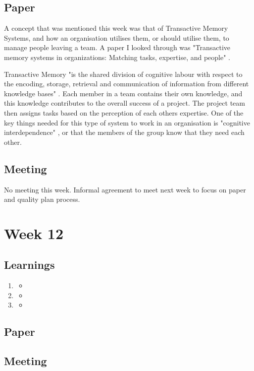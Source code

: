\section{Paper}

A concept that was mentioned this week was that of Transactive Memory Systems, and how an organisation utilises them, or should utilise them, to manage people leaving a team. A paper I looked through was "Transactive memory systems in organizations: Matching tasks, expertise, and people" \parencite{week11}. 

Transactive Memory "is the shared division of cognitive labour with respect to the encoding, storage, retrieval and communication of information from different knowledge bases" \parencite{week11}. Each member in a team contains their own knowledge, and this knowledge contributes to the overall success of a project. The project team then assigns tasks based on the perception of each others expertise. One of the key things needed for this type of system to work in an organisation is "cognitive interdependence" \parencite{week11}, or that the members of the group know that they need each other.

\section{Meeting}

No meeting this week. Informal agreement to meet next week to focus on paper and quality plan process.

\chapter{Week 12}

\section{Learnings}
\begin{enumerate}
\item
\begin{itemize}
\item
\end{itemize}
\item
\begin{itemize}
\item
\end{itemize}
\item
\begin{itemize}
\item
\end{itemize}
\end{enumerate}

\section{Paper}

\section{Meeting}


